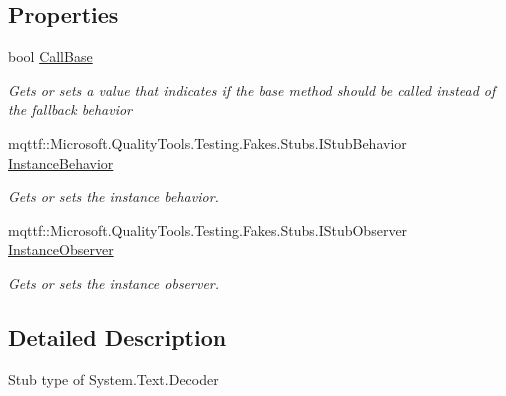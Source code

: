 \subsection*{Properties}
\begin{DoxyCompactItemize}
\item 
bool \hyperlink{class_system_1_1_text_1_1_fakes_1_1_stub_decoder_ada9819b95570b03be7d8bf4b170f2d0b}{Call\-Base}
\begin{DoxyCompactList}\small\item\em Gets or sets a value that indicates if the base method should be called instead of the fallback behavior\end{DoxyCompactList}\item 
mqttf\-::\-Microsoft.\-Quality\-Tools.\-Testing.\-Fakes.\-Stubs.\-I\-Stub\-Behavior \hyperlink{class_system_1_1_text_1_1_fakes_1_1_stub_decoder_a5498bd2d3a406ace6a57c806fdec7264}{Instance\-Behavior}
\begin{DoxyCompactList}\small\item\em Gets or sets the instance behavior.\end{DoxyCompactList}\item 
mqttf\-::\-Microsoft.\-Quality\-Tools.\-Testing.\-Fakes.\-Stubs.\-I\-Stub\-Observer \hyperlink{class_system_1_1_text_1_1_fakes_1_1_stub_decoder_a8b70e6c0bca04b411ce970ef7aed028d}{Instance\-Observer}
\begin{DoxyCompactList}\small\item\em Gets or sets the instance observer.\end{DoxyCompactList}\end{DoxyCompactItemize}


\subsection{Detailed Description}
Stub type of System.\-Text.\-Decoder



